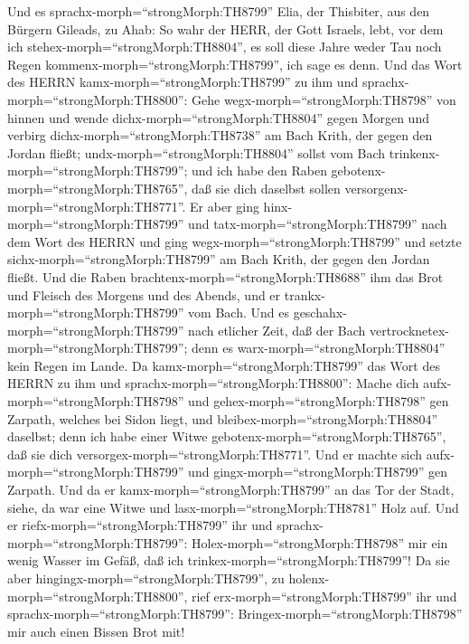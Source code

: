  Und es sprachx-morph=``strongMorph:TH8799'' Elia, der
Thisbiter, aus den Bürgern Gileads, zu Ahab: So wahr der HERR, der Gott
Israels, lebt, vor dem ich stehex-morph=``strongMorph:TH8804'', es soll
diese Jahre weder Tau noch Regen kommenx-morph=``strongMorph:TH8799'',
ich sage es denn.  Und das Wort des HERRN
kamx-morph=``strongMorph:TH8799'' zu ihm und
sprachx-morph=``strongMorph:TH8800'':  Gehe
wegx-morph=``strongMorph:TH8798'' von hinnen und wende
dichx-morph=``strongMorph:TH8804'' gegen Morgen und verbirg
dichx-morph=``strongMorph:TH8738'' am Bach Krith, der gegen den Jordan
fließt;  undx-morph=``strongMorph:TH8804'' sollst vom Bach
trinkenx-morph=``strongMorph:TH8799''; und ich habe den Raben
gebotenx-morph=``strongMorph:TH8765'', daß sie dich daselbst sollen
versorgenx-morph=``strongMorph:TH8771''.  Er aber ging
hinx-morph=``strongMorph:TH8799'' und tatx-morph=``strongMorph:TH8799''
nach dem Wort des HERRN und ging wegx-morph=``strongMorph:TH8799'' und
setzte sichx-morph=``strongMorph:TH8799'' am Bach Krith, der gegen den
Jordan fließt.  Und die Raben
brachtenx-morph=``strongMorph:TH8688'' ihm das Brot und Fleisch des
Morgens und des Abends, und er trankx-morph=``strongMorph:TH8799'' vom
Bach.  Und es geschahx-morph=``strongMorph:TH8799'' nach
etlicher Zeit, daß der Bach vertrocknetex-morph=``strongMorph:TH8799'';
denn es warx-morph=``strongMorph:TH8804'' kein Regen im Lande.
 Da kamx-morph=``strongMorph:TH8799'' das Wort des HERRN zu
ihm und sprachx-morph=``strongMorph:TH8800'':  Mache dich
aufx-morph=``strongMorph:TH8798'' und gehex-morph=``strongMorph:TH8798''
gen Zarpath, welches bei Sidon liegt, und
bleibex-morph=``strongMorph:TH8804'' daselbst; denn ich habe einer Witwe
gebotenx-morph=``strongMorph:TH8765'', daß sie dich
versorgex-morph=``strongMorph:TH8771''.  Und er machte sich
aufx-morph=``strongMorph:TH8799'' und gingx-morph=``strongMorph:TH8799''
gen Zarpath. Und da er kamx-morph=``strongMorph:TH8799'' an das Tor der
Stadt, siehe, da war eine Witwe und lasx-morph=``strongMorph:TH8781''
Holz auf. Und er riefx-morph=``strongMorph:TH8799'' ihr und
sprachx-morph=``strongMorph:TH8799'': Holex-morph=``strongMorph:TH8798''
mir ein wenig Wasser im Gefäß, daß ich
trinkex-morph=``strongMorph:TH8799''!  Da sie aber
hingingx-morph=``strongMorph:TH8799'', zu
holenx-morph=``strongMorph:TH8800'', rief
erx-morph=``strongMorph:TH8799'' ihr und
sprachx-morph=``strongMorph:TH8799'':
Bringex-morph=``strongMorph:TH8798'' mir auch einen Bissen Brot mit!
